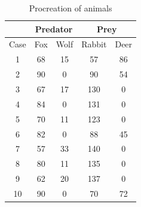 \documentclass[11pt]{article}
\begin{document}
{
	\begin{table}[p]
	\caption{Procreation of animals}

	\resizebox{8cm}{!} {
		\begin{tabular}{| c | c | c || c | c |}
		\hline

		 &\multicolumn{2}{|c||}{Predator} & \multicolumn{2}{c|}{Prey} \\
		\hline
		Case & Fox & Wolf & Rabbit & Deer \\
		\hline
		1 & 68 & 15 & 57 & 86 \\
		\hline
		2 & 90 & 0 & 90 & 54 \\
		\hline
		3 & 67 & 17 & 130 & 0 \\
		\hline
		4 & 84 & 0 & 131 & 0 \\
		\hline
		5 & 70 & 11 & 123 & 0 \\
		\hline
		6 & 82 & 0 & 88 & 45 \\
		\hline
		7 & 57 & 33 & 140 & 0 \\
		\hline
		8 & 80 & 11 & 135 & 0 \\
		\hline
		9 & 62 & 20 & 137 & 0 \\
		\hline
		10 & 90 & 0 & 70 & 72 \\
		\hline
		\end{tabular}
	}
	\label{tab:procreationTable}
	\centering
	\end{table}
}
\newpage
\end{document}
